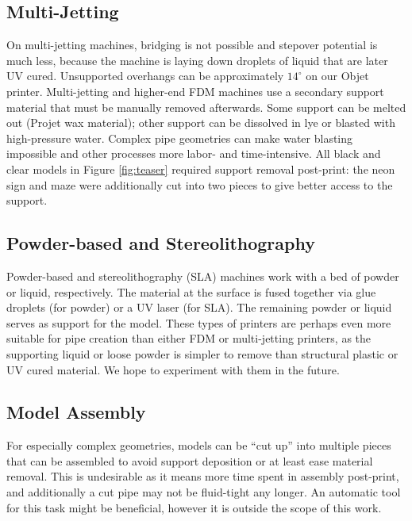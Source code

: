 \subsection{Multi-Jetting}
On multi-jetting machines, bridging is not possible and stepover potential is much less, because the machine is laying down droplets of liquid that are later UV cured.  Unsupported overhangs can be approximately $14^{\circ}$ on our Objet printer.  Multi-jetting and higher-end FDM machines use a secondary support material that must be manually removed afterwards. Some support can be melted out (Projet wax material); other support can be dissolved in lye or blasted with high-pressure water. Complex pipe geometries can make water blasting impossible and other processes more labor- and time-intensive.  All black and clear models in Figure \ref{fig:teaser} required support removal post-print: the neon sign and maze were additionally cut into two pieces to give better access to the support.

\subsection{Powder-based and Stereolithography}
Powder-based and stereolithography (SLA) machines work with a bed of powder or liquid, respectively.  The material at the surface is fused together via glue droplets (for powder) or a UV laser (for SLA).  The remaining powder or liquid serves as support for the model.  These types of printers are perhaps even more suitable for pipe creation than either FDM or multi-jetting printers, as the supporting liquid or loose powder is simpler to remove than structural plastic or UV cured material.  We hope to experiment with them in the future.

\subsection{Model Assembly}
For especially complex geometries, models can be ``cut up'' into multiple pieces that can be assembled to avoid support deposition or at least ease material removal. This is undesirable as it means more time spent in assembly post-print, and additionally a cut pipe may not be fluid-tight any longer.  An automatic tool for this task might be beneficial, however it is outside the scope of this work.